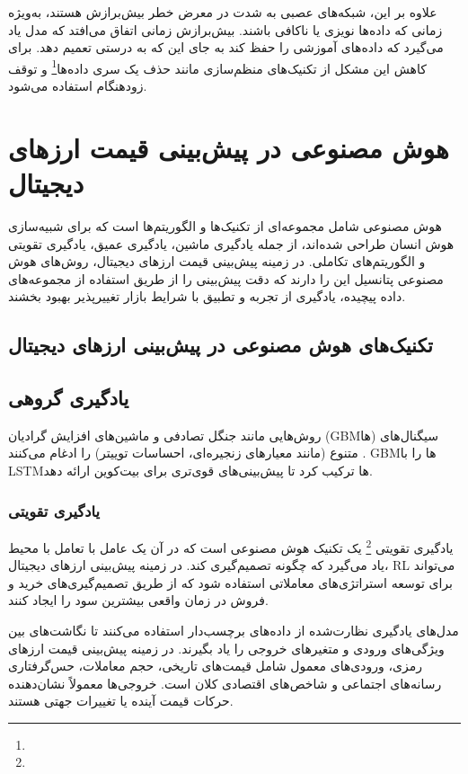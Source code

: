 {علاوه بر این، شبکه‌های عصبی به شدت در معرض خطر بیش‌برازش هستند، به‌ویژه زمانی که داده‌ها نویزی یا ناکافی باشند. بیش‌برازش زمانی اتفاق می‌افتد که مدل یاد می‌گیرد که داده‌های آموزشی را حفظ کند به جای این که به درستی تعمیم دهد. برای کاهش این مشکل از تکنیک‌های منظم‌سازی مانند حذف یک سری داده‌ها\footnote{} و توقف زودهنگام استفاده می‌شود.


\section{هوش مصنوعی در پیش‌بینی قیمت ارزهای دیجیتال}

هوش مصنوعی شامل مجموعه‌ای از تکنیک‌ها و الگوریتم‌ها است که برای شبیه‌سازی هوش انسان طراحی شده‌اند، از جمله یادگیری ماشین، یادگیری عمیق، یادگیری تقویتی و الگوریتم‌های تکاملی. در زمینه پیش‌بینی قیمت ارزهای دیجیتال، روش‌های هوش مصنوعی پتانسیل این را دارند که دقت پیش‌بینی را از طریق استفاده از مجموعه‌های داده پیچیده، یادگیری از تجربه و تطبیق با شرایط بازار تغییرپذیر بهبود بخشند.

\subsection{تکنیک‌های هوش مصنوعی در پیش‌بینی ارزهای دیجیتال}

\subsection{یادگیری گروهی}
روش‌هایی مانند جنگل تصادفی و ماشین‌های افزایش گرادیان (GBMها) سیگنال‌های متنوع (مانند معیارهای زنجیره‌ای، احساسات توییتر) را ادغام می‌کنند \cite{philippas2019financial}. \cite{arroyo2021ensemble} GBMها را با LSTMها ترکیب کرد تا پیش‌بینی‌های قوی‌تری برای بیت‌کوین ارائه دهد.


\subsubsection{یادگیری تقویتی}
 
یادگیری تقویتی \footnote{} یک تکنیک هوش مصنوعی است که در آن یک عامل با تعامل با محیط یاد می‌گیرد که چگونه تصمیم‌گیری کند. در زمینه پیش‌بینی ارزهای دیجیتال، RL می‌تواند برای توسعه استراتژی‌های معاملاتی استفاده شود که از طریق تصمیم‌گیری‌های خرید و فروش در زمان واقعی بیشترین سود را ایجاد کنند.

مدل‌های یادگیری نظارت‌شده از داده‌های برچسب‌دار استفاده می‌کنند تا نگاشت‌های بین ویژگی‌های ورودی و متغیرهای خروجی را یاد بگیرند. در زمینه پیش‌بینی قیمت ارزهای رمزی، ورودی‌های معمول شامل قیمت‌های تاریخی، حجم معاملات، حس‌گرفتاری رسانه‌های اجتماعی و شاخص‌های اقتصادی کلان است. خروجی‌ها معمولاً نشان‌دهنده حرکات قیمت آینده یا تغییرات جهتی هستند.

}
